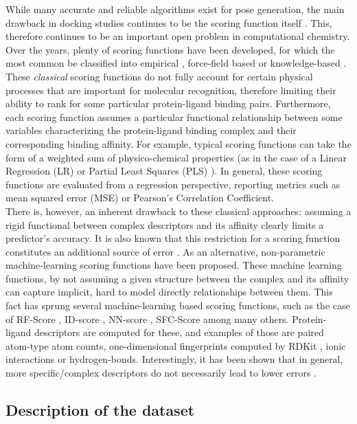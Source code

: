 \documentclass[10pt,a4paper,twoside]{book}
\begin{document}
While many accurate and reliable algorithms exist for pose generation, the main drawback in docking studies continues to be the scoring function itself \cite{Leach2006}. This, therefore continues to be an important open problem in computational chemistry. Over the years, plenty of scoring functions have been developed, for which the most common be classified into empirical \cite{Friesner2004, Krammer2005}, force-field based \cite{Huang2006} or knowledge-based \cite{Mooij2005, Gohlke2000}. These \textit{classical} scoring functions do not fully account for certain physical processes that are important for molecular recognition, therefore limiting their ability to rank for some particular protein-ligand binding pairs. Furthermore, each scoring function assumes a particular functional relationship between some variables characterizing the protein-ligand binding complex and their corresponding binding affinity. For example, typical scoring functions can take the form of a weighted sum of physico-chemical properties (as in the case of a Linear Regression (LR) or Partial Least Squares (PLS) \cite{Abdi2003}). In general, these scoring functions are evaluated from a regression perspective, reporting metrics such as mean squared error (MSE) or Pearson's Correlation Coefficient. \\


There is, however, an inherent drawback to these classical approaches: assuming a rigid functional between complex descriptors and its affinity clearly limits a predictor's accuracy. It is also known that this restriction for a scoring function constitutes an additional source of error \cite{Baum2010}. As an alternative, non-parametric machine-learning scoring functions have been proposed. These machine learning functions, by not assuming a given structure between the complex and its affinity can capture implicit, hard to model directly relationships between them. This fact has sprung several machine-learning based scoring functions, such as the case of RF-Score \cite{Ballester2010}, ID-score \cite{Li2013}, NN-score \cite{Durrant2011}, SFC-Score \cite{Zilian2013} among many others. Protein-ligand descriptors are computed for these, and examples of those are paired atom-type atom counts, one-dimensional fingerprints computed by RDKit \cite{Labute2000}, ionic interactions or hydrogen-bonds. Interestingly, it has been shown that in general, more specific/complex descriptors do not necessarily lead to lower errors \cite{Ballester2014}.

\subsection{Description of the dataset}
\end{document}
